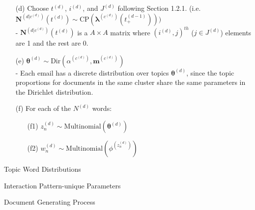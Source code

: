 \documentclass[a4paper]{article}
\begin{document}
\begin{itemize}
\begin{itemize}
		\item[(d)] Choose $t^{(d)}$, $i^{(d)}$, and $J^{(d)}$ following Section 1.2.1. (i.e. $\mathbf{N}^{(d|c^{(d)})}(t^{(d)}) \sim \mbox{CP}(\boldsymbol{\lambda}^{(c^{(d)})}(t_+^{(d-1)})))$\\
		- $\mathbf{N}^{(d|c^{(d)})}(t^{(d)})$ is a $A\times A$ matrix where $(i^{(d)}, j)^{th}$ ($j \in J^{(d)}$) elements are 1 and the rest are 0.
		\item[(e)] $\boldsymbol{\theta}^{(d)}\sim \mbox{Dir}(\alpha^{(c^{(d)})}, \boldsymbol{m}^{(c^{(d)})})$\\
		- Each email has a discrete distribution over topics $\boldsymbol{\theta}^{(d)}$, since the topic proportions for documents in the same cluster share the same parameters in the Dirichlet distribution.
	\item[(f)] For each of the $N^{(d)}$ words:
\begin{itemize}
	\item [(f1)] $z_n^{(d)} \sim \mbox{Multinomial}(\boldsymbol{\theta}^{(d)})$
	\item [(f2)] $w_n^{(d)} \sim\mbox{Multinomial} (\phi^{(z_n^{(d)})})$
\end{itemize} 
	\end{itemize}
\end{itemize}
\begin{algorithm}[H]
	\SetAlgoLined
	\caption{Topic Word Distributions}
\end{algorithm}
\begin{algorithm}[H]
	\SetAlgoLined
	\caption{Interaction Pattern-unique Parameters}
\end{algorithm}
	\begin{algorithm}[H]
		\SetAlgoLined
		\caption{Document Generating Process}
	\end{algorithm}
\end{document}
